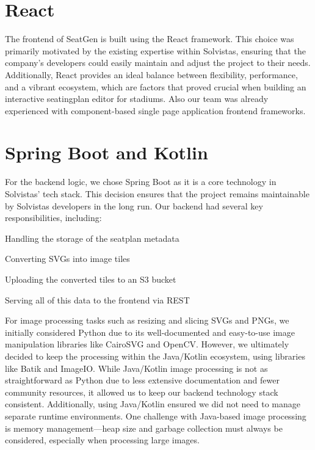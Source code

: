 \section{React}
The frontend of SeatGen is built using the React framework. This choice was primarily motivated by the existing expertise within Solvistas, ensuring that the company’s developers could easily maintain and adjust the project to their needs. Additionally, React provides an ideal balance between flexibility, performance, and a vibrant ecosystem, which are factors that proved crucial when building an interactive seatingplan editor for stadiums. Also our team was already experienced with component-based single page application frontend frameworks.

\section{Spring Boot and Kotlin}
For the backend logic, we chose Spring Boot as it is a core technology in Solvistas’ tech stack. This decision ensures that the project remains maintainable by Solvistas developers in the long run. Our backend had several key responsibilities, including:
\begin{compactitem}
    \item Handling the storage of the seatplan metadata
    \item Converting SVGs into image tiles
    \item Uploading the converted tiles to an S3 bucket
    \item Serving all of this data to the frontend via REST
\end{compactitem}

For image processing tasks such as resizing and slicing SVGs and PNGs, we initially considered Python due to its well-documented and easy-to-use image manipulation libraries like CairoSVG and OpenCV. However, we ultimately decided to keep the processing within the Java/Kotlin ecosystem, using libraries like Batik and ImageIO. While Java/Kotlin image processing is not as straightforward as Python due to less extensive documentation and fewer community resources, it allowed us to keep our backend technology stack consistent. Additionally, using Java/Kotlin ensured we did not need to manage separate runtime environments. One challenge with Java-based image processing is memory management—heap size and garbage collection must always be considered, especially when processing large images.

